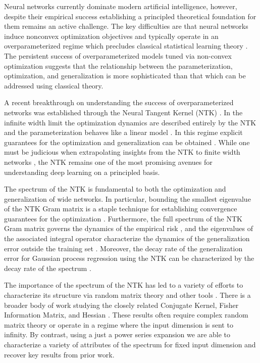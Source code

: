 Neural networks currently dominate modern artificial intelligence, however, despite their empirical success establishing a principled theoretical foundation for them remains an active challenge. The key difficulties are that neural networks induce nonconvex optimization objectives \citep{Sontag89backpropagationcan} and typically operate in an overparameterized regime which precludes classical statistical learning theory \citep{DBLP:books/daglib/0025992}. The persistent success of overparameterized models tuned via non-convex optimization suggests that the relationship between the parameterization, optimization, and generalization is more sophisticated than that which can be addressed using classical theory. 
\par
A recent breakthrough on understanding the success of overparameterized networks was established through the Neural Tangent Kernel (NTK) \citep{jacot_ntk}.  In the infinite width limit the optimization dynamics are described entirely by the NTK and the parameterization behaves like a linear model \citep{Lee2019WideNN-SHORT}.  In this regime explicit guarantees for the optimization and generalization can be obtained \citep{du2019gradient,du2018gradient,fine_grain_arora, allenzhu2019convergence, zou2020gradient}.  While one must be judicious when extrapolating insights from the NTK to finite width networks \citep{10.5555/3495724.3496995}, the NTK remains one of the most promising avenues for understanding deep learning on a principled basis.
\par
The spectrum of the NTK is fundamental to both the optimization and generalization of wide networks. In particular, bounding the smallest eigenvalue of the NTK Gram matrix is a staple technique for establishing convergence guarantees for the optimization \citep{du2019gradient,du2018gradient,solt_mod_over}.  Furthermore, the full spectrum of the NTK Gram matrix governs the dynamics of the empirical risk \citep{arora_exact_comp}, and the eigenvalues of the associated integral operator characterize the dynamics of the generalization error outside the training set \citep{bowman2022spectral, bowman2022implicit}. Moreover, the decay rate of the generalization error for Gaussian process regression using the NTK can be characterized by the decay rate of the spectrum \citep{caponnetto2007optimal, cui2021generalization,jin2022learning}. 
\par
The importance of the spectrum of the NTK has led to a variety of efforts to characterize its structure via random matrix theory and other tools \citep{https://doi.org/10.48550/arxiv.1907.10599,NEURIPS2020_572201a4}.  There is a broader body of work studying the closely related Conjugate Kernel, Fisher Information Matrix, and Hessian \citep{Poole2016,pennington_nonlinear,pennington_shallow,10.2307/26542333,Karakida_2020}.  These results often require complex random matrix theory or operate in a regime where the input dimension is sent to infinity.  By contrast, using a just a power series expansion we are able to characterize a variety of attributes of the spectrum for fixed input dimension and recover key results from prior work. 

